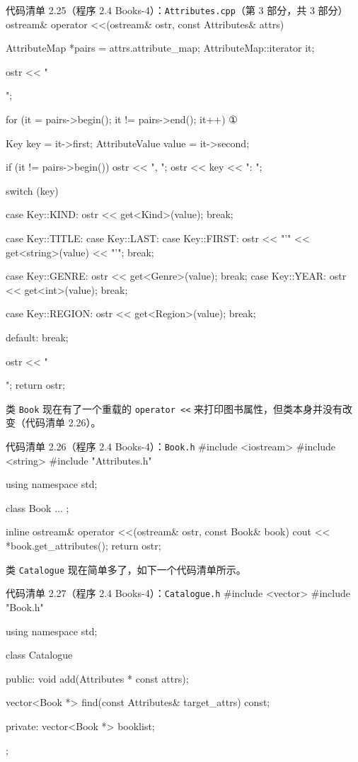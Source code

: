 \begin{codeboxt}{代码清单 2.25（程序 2.4 Books-4）：\texttt{Attributes.\allowbreak{}cpp}（第 3 部分，共 3 部分）}
ostream& operator <<(ostream& ostr, const Attributes& attrs)
{
    AttributeMap *pairs = attrs.attribute_map;
    AttributeMap::iterator it;

    ostr << "{";

    for (it = pairs->begin(); it != pairs->end(); it++)      ①
    {
        Key            key   = it->first;
        AttributeValue value = it->second;

        if (it != pairs->begin()) ostr << ", ";
        ostr << key << ": ";

        switch (key)
        {
            case Key::KIND:   ostr << get<Kind>(value); break;

            case Key::TITLE:
            case Key::LAST:
            case Key::FIRST:  ostr << "'" << get<string>(value)
                                   << "'"; break;

            case Key::GENRE:  ostr << get<Genre>(value);  break;
            case Key::YEAR:   ostr << get<int>(value);    break;

            case Key::REGION: ostr << get<Region>(value); break;

            default: break;
        }
    }

    ostr << "}";
    return ostr;
}
\end{codeboxt}
\par

类 \texttt{Book} 现在有了一个重载的 \texttt{operator <<} 来打印图书属性，但类本身并没有改变（代码清单 2.26）。

\begin{codeboxt}{代码清单 2.26（程序 2.4 Books-4）：\texttt{Book.h}}
#include <iostream>
#include <string>
#include "Attributes.h"

using namespace std;

class Book
{
    ...
};

inline ostream& operator <<(ostream& ostr, const Book& book)
{
    cout << *book.get_attributes();
    return ostr;
}
\end{codeboxt}

类 \texttt{Catalogue} 现在简单多了，如下一个代码清单所示。

\begin{codeboxt}{代码清单 2.27（程序 2.4 Books-4）：\texttt{Catalogue.\allowbreak{}h}}
#include <vector>
#include "Book.h"

using namespace std;

class Catalogue
{
public:
    void add(Attributes * const attrs);

    vector<Book *> find(const Attributes& target_attrs) const;

private:
    vector<Book *> booklist;
};
\end{codeboxt}

